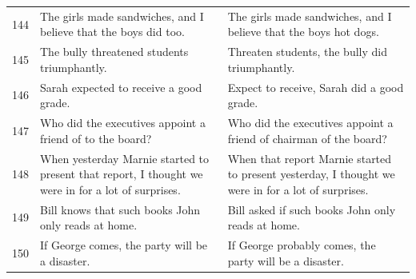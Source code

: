 \documentclass[doc]{apa6}
\begin{document}
\begin{small}
\begin{longtable}{p{1cm} | p{8.5cm} | p{8.5cm}}
144 & The girls made sandwiches, and I believe that the boys did too. & The girls made sandwiches, and I believe that the boys hot dogs.\\
145 & The bully threatened students triumphantly. & Threaten students, the bully did triumphantly.\\
146 & Sarah expected to receive a good grade. & Expect to receive, Sarah did a good grade.\\
147 & Who did the executives appoint a friend of to the board? & Who did the executives appoint a friend of chairman of the board?\\
148 & When yesterday Marnie started to present that report, I thought we were in for a lot of surprises. & When that report Marnie started to present yesterday, I thought we were in for a lot of surprises.\\
149 & Bill knows that such books John only reads at home. & Bill asked if such books John only reads at home.\\
150 & If George comes, the party will be a disaster. & If George probably comes, the party will be a disaster.\\
\end{longtable}
\end{small}
\end{document}
